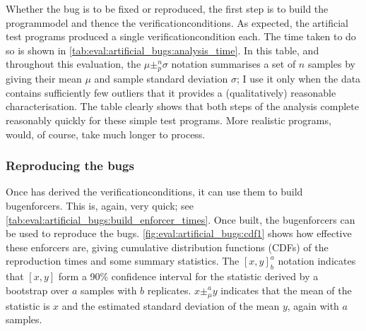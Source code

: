 Whether the bug is to be fixed or reproduced, the first step is to
build the \gls{programmodel} and thence the
\glspl{verificationcondition}.  As expected, the artificial test
programs produced a single \gls{verificationcondition} each.  The time
taken to do so is shown in
\autoref{tab:eval:artificial_bugs:analysis_time}.  In this table, and
throughout this evaluation, the $\mu \pm^n_p \sigma$ notation
summarises a set of $n$ samples by giving their mean $\mu$ and sample
standard deviation $\sigma$; I use it only when the data contains
sufficiently few outliers that it provides a (qualitatively)
reasonable characterisation.  The table clearly shows that both steps
of the analysis complete reasonably quickly for these simple test
programs.  More realistic programs, would, of course, take much longer
to process.

\subsubsection{Reproducing the bugs}

Once {\implementation} has derived the \glspl{verificationcondition},
it can use them to build \glspl{bugenforcer}.  This is, again, very
quick; see \autoref{tab:eval:artificial_bugs:build_enforcer_times}.
Once built, the \glspl{bugenforcer} can be used to reproduce the bugs.
\autoref{fig:eval:artificial_bugs:cdf1} shows how effective these
enforcers are, giving cumulative distribution functions (CDFs) of the
reproduction times and some summary statistics.  The $[x,y]_b^a$
notation indicates that $[x,y]$ form a 90\% confidence interval for
the statistic derived by a bootstrap over $a$ samples with $b$
replicates.  $x \pm_{\mu}^a y$ indicates that the mean of the
statistic is $x$ and the estimated standard deviation of the mean $y$,
again with $a$ samples.  


